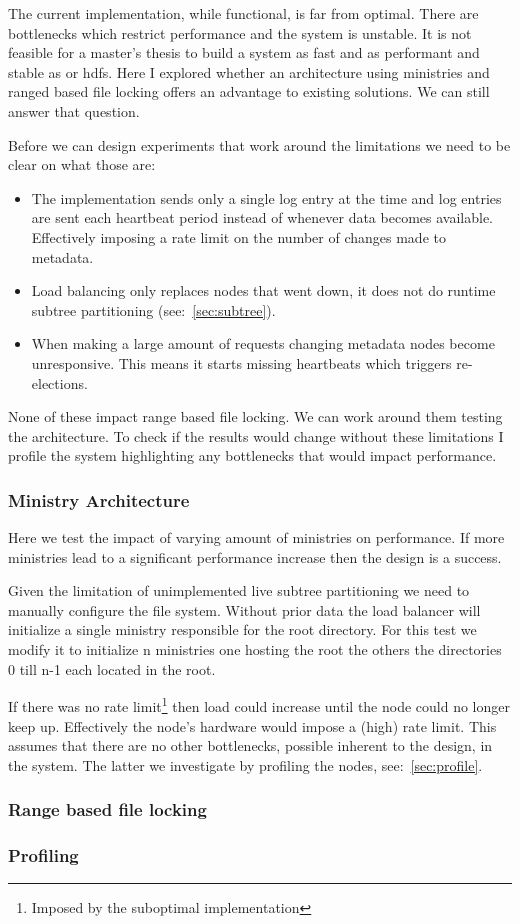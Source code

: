 The current implementation, while functional, is far from optimal. There are bottlenecks which restrict performance and the system is unstable. It is not feasible for a master’s thesis to build a system as fast and as performant and stable as \ceph{} or \ac{hdfs}. Here I explored whether an architecture using ministries and ranged based file locking offers an advantage to existing solutions. We can still answer that question. 

Before we can design experiments that work around the limitations we need to be clear on what those are:

\begin{itemize}
	\item The \raft{} implementation sends only a single log entry at the time and log entries are sent each heartbeat period instead of whenever data becomes available. Effectively imposing a rate limit on the number of changes made to metadata.
	\item Load balancing only replaces nodes that went down, it does not do runtime subtree partitioning (see:~\cref{sec:subtree}).
	\item When making a large amount of requests changing metadata nodes become unresponsive. This means it starts missing heartbeats which triggers re-elections. %
\end{itemize}

None of these impact range based file locking. We can work around them testing the architecture. To check if the results would change without these limitations I profile the system highlighting any bottlenecks that would impact performance.

\subsubsection*{Ministry Architecture}
Here we test the impact of varying amount of ministries on performance. If more ministries lead to a significant performance increase then the design is a success. 

Given the limitation of unimplemented live subtree partitioning we need to manually configure the file system. Without prior data the load balancer will initialize a single ministry responsible for the root directory. For this test we modify it to initialize n ministries one hosting the root the others the directories 0 till n-1 each located in the root.

If there was no rate limit\footnote{Imposed by the suboptimal \raft{} implementation} then load could increase until the node could no longer keep up. Effectively the node's hardware would impose a (high) rate limit. This assumes that there are no other bottlenecks, possible inherent to the design, in the system. The latter we investigate by profiling the nodes, see:~\cref{sec:profile}.


\subsubsection*{Range based file locking}

\subsubsection*{Profiling} \label{sec:profile}
